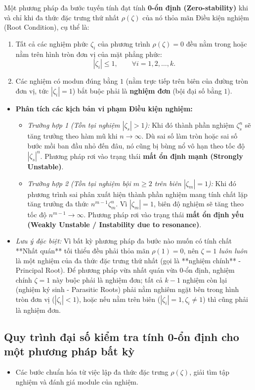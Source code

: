 \begin{theorem}
Một phương pháp đa bước tuyến tính đạt tính \textbf{0-ổn định (Zero-stability)} khi và chỉ khi đa thức đặc trưng thứ nhất $\rho(\zeta)$ của nó thỏa mãn Điều kiện nghiệm (Root Condition), cụ thể là:
\begin{enumerate}
    \item Tất cả các nghiệm phức $\zeta_i$ của phương trình $\rho(\zeta) = 0$ đều nằm trong hoặc nằm trên hình tròn đơn vị của mặt phẳng phức:
    \[
        |\zeta_i| \le 1, \qquad \forall i = 1, 2, \dots, k.
    \]
    \item Các nghiệm có modun đúng bằng $1$ (nằm trực tiếp trên biên của đường tròn đơn vị, tức $|\zeta_i| = 1$) bắt buộc phải là \textbf{nghiệm đơn} (bội đại số bằng $1$).
\end{enumerate}
\end{theorem}

\begin{itemize}
    \item \textbf{Phân tích các kịch bản vi phạm Điều kiện nghiệm:}
    \begin{itemize}
        \item \textit{Trường hợp 1 (Tồn tại nghiệm $|\zeta_s| > 1$):} Khi đó thành phần nghiệm $\zeta_s^n$ sẽ tăng trưởng theo hàm mũ khi $n \to \infty$. Dù sai số làm tròn hoặc sai số bước mồi ban đầu nhỏ đến đâu, nó cũng bị bùng nổ vô hạn theo tốc độ $|\zeta_s|^n$. Phương pháp rơi vào trạng thái \textbf{mất ổn định mạnh (Strongly Unstable)}.
        \item \textit{Trường hợp 2 (Tồn tại nghiệm bội $m \ge 2$ trên biên $|\zeta_m| = 1$):} Khi đó phương trình sai phân xuất hiện thành phần nghiệm mang tính chất lặp tăng trưởng đa thức $n^{m-1} \zeta_m^n$. Vì $|\zeta_m| = 1$, biên độ nghiệm sẽ tăng theo tốc độ $n^{m-1} \to \infty$. Phương pháp rơi vào trạng thái \textbf{mất ổn định yếu (Weakly Unstable / Instability due to resonance)}.
    \end{itemize}
    \item \textit{Lưu ý đặc biệt:} Vì bất kỳ phương pháp đa bước nào muốn có tính chất **Nhất quán** tối thiểu đều phải thỏa mãn $\rho(1) = 0$, nên $\zeta = 1$ \textit{luôn luôn} là một nghiệm của đa thức đặc trưng thứ nhất (gọi là **nghiệm chính** - Principal Root). Để phương pháp vừa nhất quán vừa 0-ổn định, nghiệm chính $\zeta = 1$ này buộc phải là nghiệm đơn; tất cả $k-1$ nghiệm còn lại (nghiệm ký sinh - Parasitic Roots) phải nằm nghiêm ngặt bên trong hình tròn đơn vị ($|\zeta_i| < 1$), hoặc nếu nằm trên biên ($|\zeta_i| = 1, \zeta_i \neq 1$) thì cũng phải là nghiệm đơn.
\end{itemize}



\subsection{Quy trình đại số kiểm tra tính 0-ổn định cho một phương pháp bất kỳ}
\begin{itemize}
    \item Các bước chuẩn hóa từ việc lập đa thức đặc trưng $\rho(\zeta)$, giải tìm tập nghiệm và đánh giá module của nghiệm.
\end{itemize}

\newpage